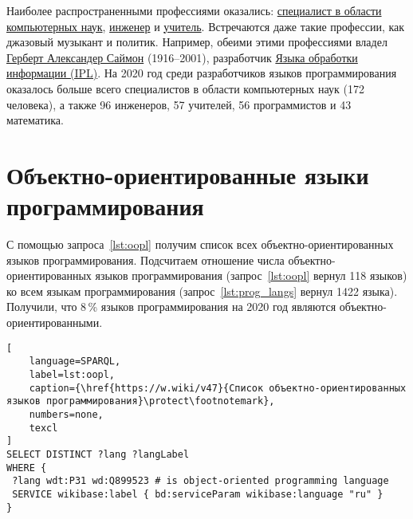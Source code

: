 Наиболее распространенными профессиями оказались: 
\href{https://www.wikidata.org/wiki/Q21198}{специалист в области компьютерных наук}, 
\href{https://www.wikidata.org/wiki/Q81096}{инженер} 
и \href{https://www.wikidata.org/wiki/Q37226}{учитель}. 
Встречаются даже такие профессии, как джазовый музыкант и политик. 
Например, обеими этими профессиями владел 
\href{https://www.wikidata.org/wiki/Q181529}{Герберт Александер Саймон} (1916--2001), 
разработчик \href{https://en.wikipedia.org/wiki/Information_Processing_Language}{Языка обработки информации (IPL)}. 
На 2020 год среди разработчиков языков программирования оказалось больше всего специалистов 
в области компьютерных наук (172 человека), а также 96 инженеров, 57 учителей, 56 программистов и 43 математика.



\section{Объектно-ориентированные языки программирования}

С помощью запроса~\ref{lst:oopl} 
получим список всех объектно-ориентированных языков программирования. 
Подсчитаем отношение числа объектно-ориентированных языков программирования 
(запрос~\ref{lst:oopl} вернул 118 языков) 
ко всем языкам программирования 
(запрос~\ref{lst:prog_langs} вернул 1422 языка).
Получили, что 8\,\% языков программирования на 2020 год являются объектно-ориентированными. 

\begin{lstlisting}[
	language=SPARQL,
	label=lst:oopl,
	caption={\href{https://w.wiki/v47}{Список объектно-ориентированных языков программирования}\protect\footnotemark},
    numbers=none,
	texcl
]
SELECT DISTINCT ?lang ?langLabel
WHERE {
 ?lang wdt:P31 wd:Q899523 # is object-oriented programming language
 SERVICE wikibase:label { bd:serviceParam wikibase:language "ru" }
}
\end{lstlisting}






